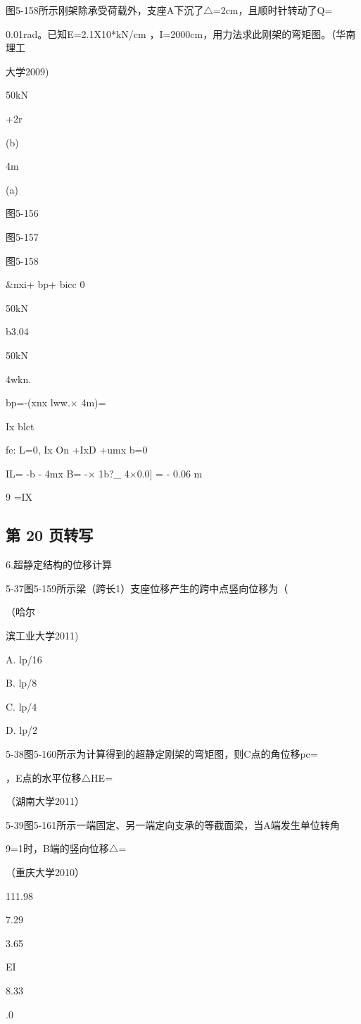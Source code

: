 图5-158所示刚架除承受荷载外，支座A下沉了$\triangle$=2cm，且顺时针转动了Q=

0.01rad。已知E=2.1X10*kN/cm ，I=2000cm，用力法求此刚架的弯矩图。（华南理工

大学2009)

50kN

+2r

(b)

4m

(a)

图5-156

图5-157

图5-158

\&nxi+ bp+ bicc 0

50kN

b3.04

50kN

4wkn.

bp=-(xnx lww.$\times$ 4m)=

Ix blct

fe: L=0, Ix On +IxD +umx b=0

IL= -b - 4mx B= -$\times$ 1b?\_ 4$\times$0.0] = - 0.06 m

9 =IX

\subsection*{第 20 页转写}
6.超静定结构的位移计算

5-37图5-159所示梁（跨长1）支座位移产生的跨中点竖向位移为（

（哈尔

滨工业大学2011)

A. lp/16

B. lp/8

C. lp/4

D. lp/2

5-38图5-160所示为计算得到的超静定刚架的弯矩图，则C点的角位移pc=

，E点的水平位移$\triangle$HE=

（湖南大学2011）

5-39图5-161所示一端固定、另一端定向支承的等截面梁，当A端发生单位转角

9=1时，B端的竖向位移$\triangle$=

（重庆大学2010）

111.98

7.29

3.65

EI

8.33

.0

